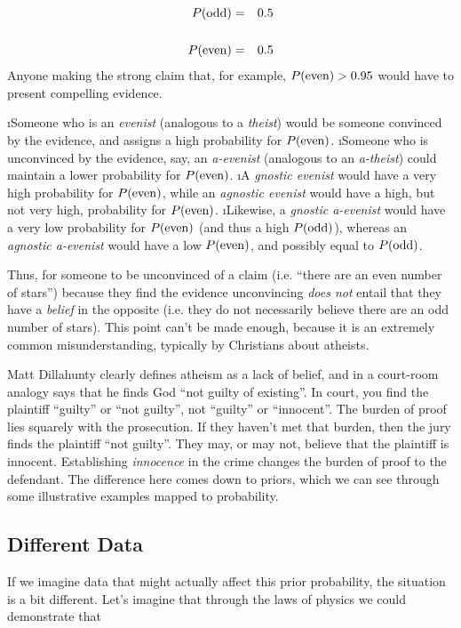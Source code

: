 \begin{eqnarray*}
P({\rm odd}) &=&0.5 \\\\
P({\rm even})&=&0.5
\end{eqnarray*}
Anyone making the strong claim that, for example, $P({\rm even})>0.95$ would have to present compelling evidence.  

\bi
\i Someone who is an {\em evenist} (analogous to a {\em theist}) would be someone convinced by the evidence, and assigns a high probability for $P({\rm even})$.  
\i Someone who is unconvinced by the evidence, say, an {\em a-evenist} (analogous to an {\em a-theist}) could maintain a lower probability for $P({\rm even})$.  
\i A {\em gnostic evenist} would have a very high probability for $P({\rm even})$, while an {\em agnostic evenist} would have a high, but not very high, probability for $P({\rm even})$.  
\i Likewise, a {\em gnostic a-evenist} would have a very low probability for $P({\rm even})$ (and thus a high $P({\rm odd})$), whereas an {\em agnostic a-evenist} would have a low $P({\rm even})$, and possibly equal to $P({\rm odd})$.  
\ei

Thus, for someone to be unconvinced of a claim (i.e. ``there are an even number of stars'') because they find the evidence unconvincing {\em does not} entail that they have a {\em belief} in the opposite (i.e. they do not necessarily believe there are an odd number of stars).  This point can't be made enough, because it is an extremely common misunderstanding, typically by Christians about atheists.

Matt Dillahunty clearly defines atheism as a lack of belief, and in a
court-room analogy says that he finds God ``not guilty of existing''. In
court, you find the plaintiff ``guilty'' or ``not guilty'', not
``guilty'' or ``innocent''. The burden of proof lies squarely with the
prosecution. If they haven't met that burden, then the jury finds the
plaintiff ``not guilty''. They may, or may not, believe that the
plaintiff is innocent. Establishing \emph{innocence} in the crime
changes the burden of proof to the defendant. The difference here comes
down to priors, which we can see through some illustrative examples
mapped to probability.

\subsection{Different Data}\label{different-data}

If we imagine data that might actually affect this prior probability,
the situation is a bit different. Let's imagine that through the laws of
physics we could demonstrate that


